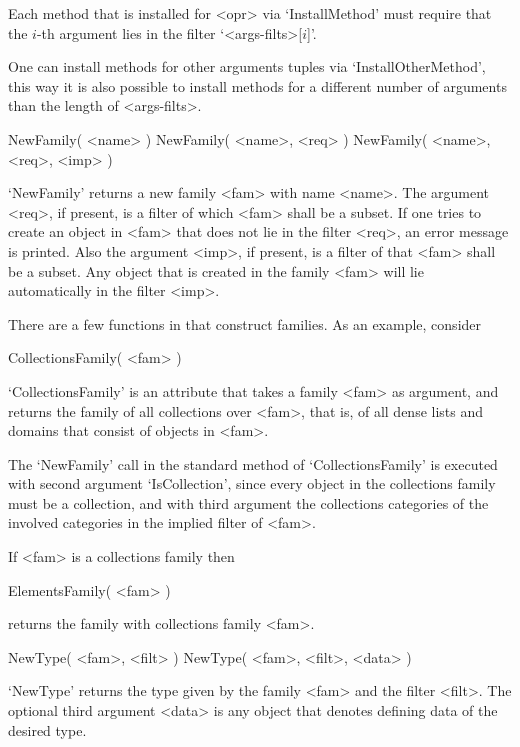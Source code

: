 Each method that is installed for <opr> via `InstallMethod' must require
that the $i$-th argument lies in the filter `<args-filts>[$i$]'.

One can install methods for other arguments tuples via
`InstallOtherMethod',
this way it is also possible to install methods for a different number
of arguments than the length of <args-filts>.



\>NewFamily( <name> )
\)NewFamily( <name>, <req> )
\)NewFamily( <name>, <req>, <imp> )

`NewFamily' returns a new family <fam> with name <name>.
The argument <req>, if present, is a filter of which <fam> shall be a
subset.
If one tries to create an object in <fam> that does not lie in the filter
<req>, an error message is printed.
Also the argument <imp>, if present, is a filter of that <fam> shall be a
subset.
Any object that is created in the family <fam> will lie automatically in
the filter <imp>.

There are a few functions in {\GAP} that construct families.
As an example, consider

\>CollectionsFamily( <fam> )

`CollectionsFamily' is an attribute that takes a family <fam> as
argument, and returns the family of all collections over <fam>,
that is, of all dense lists and domains that consist of objects in
<fam>.

The `NewFamily' call in the standard method of `CollectionsFamily'
is executed with second argument `IsCollection',
since every object in the collections family must be a collection,
and with third argument the collections categories of the involved
categories in the implied filter of <fam>.

If <fam> is a collections family then

\>ElementsFamily( <fam> )

returns the family with collections family <fam>.



\>NewType( <fam>, <filt> )
\)NewType( <fam>, <filt>, <data> )

`NewType' returns the type given by the family <fam>
and the filter <filt>.
The optional third argument <data> is any object that denotes defining
data of the desired type.


